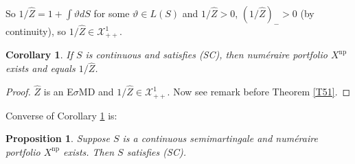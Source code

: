 \documentclass[12pt,a4paper, twoside]{article}
\newtheorem{prop}{Proposition}[section]
\newtheorem{cor}{Corollary}[section]
\theoremstyle{definition}
\begin{document}
So $1/ \hat{Z}= 1 + \int \vartheta dS$ for some $\vartheta \in L(S)$ and $1/\hat{Z}>0$, $(1/\hat{Z})_- >0$ (by continuity), so $1/\hat{Z} \in \mathcal{X}_{++}^1$. 
\begin{cor} \label{C55} If $S$ is continuous and satisfies (SC), then numéraire portfolio $X^\text{np}$ exists and equals $1/\hat{Z}$.
\end{cor}
\begin{proof}
$\hat{Z}$ is an E$\sigma$MD and $1/\hat{Z} \in \mathcal{X}_{++}^1$. Now see remark before Theorem \ref{T51}.
\end{proof}
Converse of Corollary \ref{C55} is:
\begin{prop}\label{P56} Suppose $S$ is a continuous semimartingale and numéraire portfolio $X^\text{np}$ exists. Then $S$ satisfies (SC). 
\end{prop}
\end{document}
